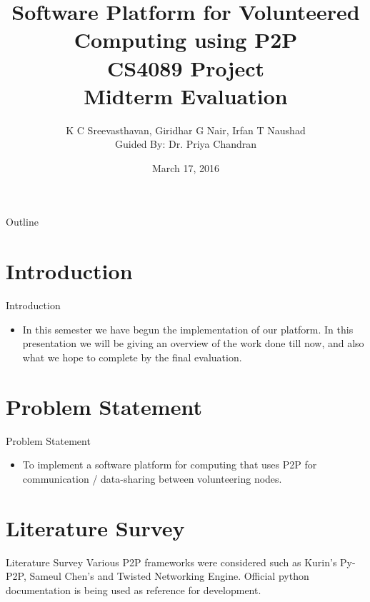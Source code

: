 \documentclass{beamer}
\title{\textbf{Software Platform for Volunteered Computing using P2P}\\ \vspace{2.5mm} {\normalsize CS4089 Project\\Midterm Evaluation}}
\author{K C Sreevasthavan, Giridhar G Nair, Irfan T Naushad\\Guided By: Dr. Priya Chandran}
\date{March 17, 2016}
\begin{document}
\begin{frame}
  \titlepage
\end{frame}

\begin{frame}{Outline}
  \tableofcontents
\end{frame}
\section{Introduction}
\begin{frame}{Introduction}
\begin{itemize}
\item In this semester we have begun the implementation of our platform.
In this presentation we will be giving an overview of the work done till now, 
and also what we hope to complete by the final evaluation.
\end{itemize}
 
\end{frame}
\section{Problem Statement}
\begin{frame}{Problem Statement}
\begin{itemize}
\item To implement a software platform for
computing that uses P2P for communication / data-sharing between volunteering nodes.
\end{itemize}
\end{frame}

\section{Literature Survey }
\begin{frame}{Literature Survey}
Various P2P frameworks were considered such as Kurin's Py-P2P\cite{kurin}, Sameul Chen's\cite{chen} 
and Twisted Networking Engine\cite{twisted}. Official python documentation \cite{python} is being used as 
reference for development.
\end{frame}
\end{document}
